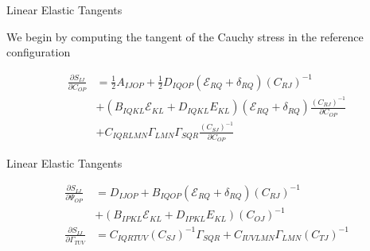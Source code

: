 \documentclass[11pt]{beamer}
\begin{document}
\begin{frame}{Linear Elastic Tangents}

We begin by computing the tangent of the Cauchy stress in the reference configuration


\begin{align*}
\frac{\partial S_{IJ}}{\partial C_{OP}} &= \frac{1}{2}A_{IJOP} + \frac{1}{2}D_{IQOP} \left(\mathcal{E}_{RQ} + \delta_{RQ}\right)\left(C_{RJ}\right)^{-1}\\
& + \left(B_{IQKL} \mathcal{E}_{KL} + D_{IQKL} E_{KL}\right)\left(\mathcal{E}_{RQ} + \delta_{RQ} \right)\frac{\left(C_{RJ}\right)^{-1}}{\partial C_{OP}}\\
&+C_{IQRLMN} \Gamma_{LMN} \Gamma_{SQR} \frac{\left(C_{SJ}\right)^{-1}}{\partial C_{OP}}
\end{align*}

\end{frame}

\begin{frame}{Linear Elastic Tangents}

\begin{align*}
\frac{\partial S_{IJ}}{\partial \Psi_{OP}} &= D_{IJOP} + B_{IQOP}\left(\mathcal{E}_{RQ} + \delta_{RQ}\right) \left(C_{RJ}\right)^{-1}\\
&+ \left(B_{IPKL} \mathcal{E}_{KL} + D_{IPKL} E_{KL}\right)\left(C_{OJ}\right)^{-1}\\
\frac{\partial S_{IJ}}{\partial \Gamma_{TUV}} &=  C_{IQRTUV} \left(C_{SJ}\right)^{-1} \Gamma_{SQR} + C_{IUVLMN} \Gamma_{LMN} \left(C_{TJ}\right)^{-1}
\end{align*}

\end{frame}
\end{document}
